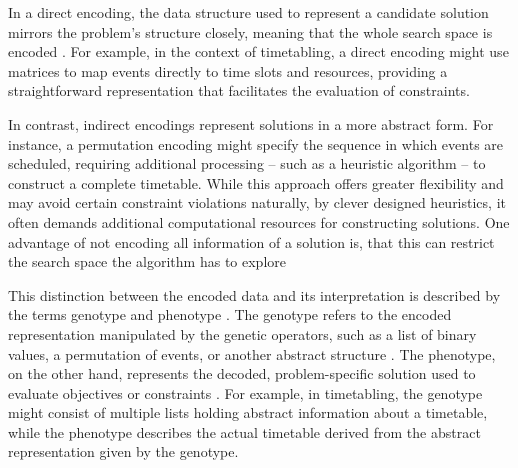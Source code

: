 \documentclass[english,examples]{isasthesis}
\begin{document}
In a direct encoding, the data structure used to represent a candidate solution
mirrors the problem's structure closely, meaning that the whole search space
is encoded \cite{Thanh2007,Goos2002}.
For example, in the context of timetabling, a direct encoding might use
matrices to map events directly to time slots and resources, providing a
straightforward representation that facilitates the evaluation of constraints.

In contrast, indirect encodings represent solutions in a more abstract form.
For instance, a permutation encoding might specify the sequence in which events
are scheduled, requiring additional processing -- such as a heuristic algorithm
-- to construct a complete timetable. While this approach offers greater
flexibility and may avoid certain constraint violations naturally, by clever
designed heuristics, it often demands additional computational resources for
constructing solutions.
One advantage of not encoding all information of a solution is, that
this can restrict the search space the algorithm has to explore \cite{Goos2002}

This distinction between the encoded data and its interpretation is described
by the terms genotype and phenotype \cite{Katoch2021}.
The genotype refers to the encoded representation manipulated by the genetic
operators, such as a list of binary values, a permutation of events, or another
abstract structure \cite{Affenzeller2009,Katoch2021}.
The phenotype, on the other hand, represents the decoded, problem-specific
solution used to evaluate objectives or constraints
\cite{Affenzeller2009,Katoch2021}.
For example, in timetabling, the genotype might consist of multiple lists
holding abstract information about a timetable, while the phenotype describes
the actual timetable derived from the abstract representation given by the
genotype.


\end{document}
